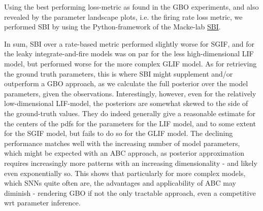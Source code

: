 \documentclass[mphil,deptreport,ianc]{infthesis} %
\begin{document}
Using the best performing loss-metric as found in the GBO experiments, and also revealed by the parameter landscape plots, i.e. the firing rate loss metric, we performed SBI by using the Python-framework of the Macke-lab \href{https://github.com/mackelab/sbi}{SBI}.

In sum, SBI over a rate-based metric performed slightly worse for SGIF, and for the leaky integrate-and-fire models was on par for the less high-dimensional LIF model, but performed worse for the more complex GLIF model.
As for retrieving the ground truth parameters, this is where SBI might supplement and/or outperform a GBO approach, as we calculate the full posterior over the model parameters, given the observations.
Interestingly, however, even for the relatively low-dimensional LIF-model, the posteriors are somewhat skewed to the side of the ground-truth values. They do indeed generally give a reasonable estimate for the centers of the pdfs for the parameters for the LIF model, and to some extent for the SGIF model, but fails to do so for the GLIF model.
The declining performance matches well with the increasing number of model parameters, which might be expected with an ABC approach, as posterior approximation requires increasingly more patterns with an increasing dimensionality - and likely even exponentially so.
This shows that particularly for more complex models, which SNNs quite often are, the advantages and applicability of ABC may diminish - rendering GBO if not the only tractable approach, even a competitive wrt parameter inference.
\end{document}
